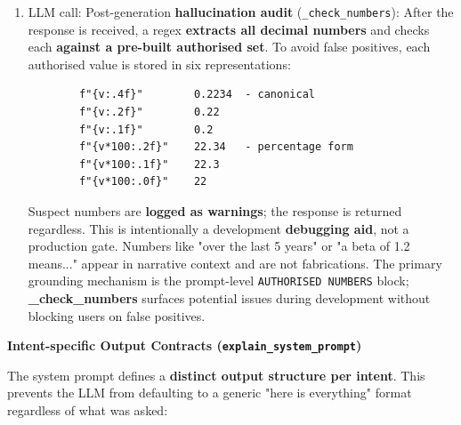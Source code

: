 \begin{enumerate}
    A \texttt{thinking\_budget} of \texttt{1024} tokens allows for a \textbf{private chain-of-thought} pass before the visible response is generated. This is most valuable for:
    \begin{itemize}
        \item \textbf{comparison mode}, where the model must compute before/after deltas across two full scalar-metric sets, and
        \item \textbf{dual-intent} messages, where it must structure two coherent answers from a shared data pool without repeating information.
    \end{itemize}

    This private reasoning does not appear in the user-facing output, so it improves coherence without increasing visible response length.

    \item LLM call:
    Post-generation \textbf{hallucination audit} (\texttt{\_check\_numbers}):
    After the response is received, a regex \textbf{extracts all decimal numbers} and checks each \textbf{against a pre-built authorised set}. To avoid false positives, each authorised value is stored in six representations:
    \begin{lstlisting}
        f"{v:.4f}"        0.2234  - canonical
        f"{v:.2f}"        0.22
        f"{v:.1f}"        0.2
        f"{v*100:.2f}"    22.34   - percentage form
        f"{v*100:.1f}"    22.3
        f"{v*100:.0f}"    22
    \end{lstlisting}

    Suspect numbers are \textbf{logged as warnings}; the response is returned regardless. This is intentionally a development \textbf{debugging aid}, not a production gate. Numbers like "over the last 5 years" or "a beta of 1.2 means..." appear in narrative context and are not fabrications. The primary grounding mechanism is the prompt-level \texttt{AUTHORISED NUMBERS} block; \textbf{\_check\_numbers} surfaces potential issues during development without blocking users on false positives.\\

\end{enumerate}

\textbf{Intent-specific Output Contracts (\texttt{explain\_system\_prompt})}

The system prompt defines a \textbf{distinct output structure per intent}. This prevents the LLM from defaulting to a generic "here is everything" format regardless of what was asked:

